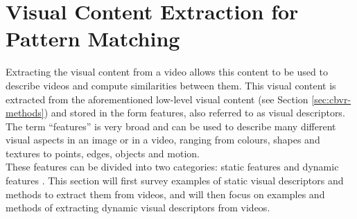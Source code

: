\section{Visual Content Extraction for Pattern Matching}
\label{sec:visual-content-extraction}

Extracting the visual content from a video allows this content to be used to describe videos and compute similarities between them. This visual content is extracted from the aforementioned low-level visual content (see Section \ref{sec:cbvr-methods}) \cite{petkovic2000} and stored in the form features, also referred to as visual descriptors. The term ``features'' is very broad and can be used to describe many different visual aspects in an image or in a video, ranging from colours, shapes and textures to points, edges, objects and motion.\\

These features can be divided into two categories: static features and dynamic features \cite{petkovic2000}. This section will first survey examples of static visual descriptors and methods to extract them from videos, and will then focus on examples and methods of extracting dynamic visual descriptors from videos.


